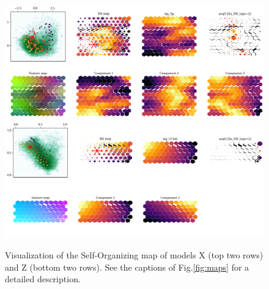 \documentclass[utf8]{frontiersSCNS} %
\begin{document}
\begin{figure}[h!]
	\begin{center}
		\includegraphics[width=16cm]{XuBorovsky/maps}\\%
		\includegraphics[width=16cm]{ZhaZuFi/maps}
	\end{center}
	\caption{Visualization of the Self-Organizing map of models X (top two rows) and Z (bottom two rows). See the captions of Fig.\ref{fig:maps} for a detailed description.}\label{fig:modelsXZ}
\end{figure}

\end{document}
